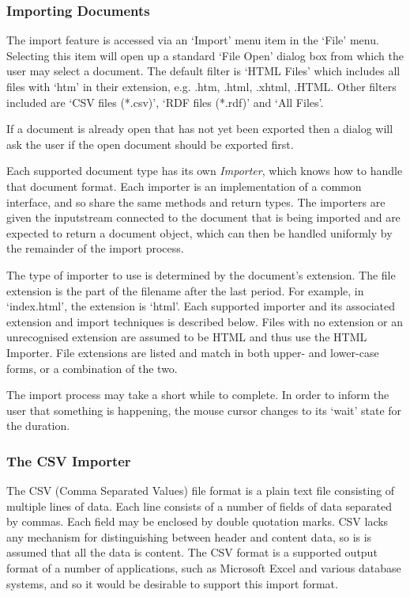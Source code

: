 \subsubsection{Importing Documents}

The import feature is accessed via an `Import' menu item in the `File' menu.
Selecting this item will open up a standard `File Open' dialog box from which
the user may select a document. The default filter is `HTML Files' which
includes all files with `htm' in their extension, e.g. .htm, .html, .xhtml,
.HTML. Other filters included are `CSV files (*.csv)', `RDF files (*.rdf)' and
`All Files'. 

If a document is already open that has not yet been exported then a
dialog will ask the user if the open document should be exported first.

Each supported document type has its own \emph{Importer}, which knows how to
handle that document format. Each importer is an implementation of a common
interface, and so share the same methods and return types. The importers are
given the inputstream connected to the document that is being imported and are
expected to return a document object, which can then be handled uniformly by
the remainder of the import process.

The type of importer to use is determined by the document's extension. The file
extension is the part of the filename after the last period. For example, in
`index.html', the extension is `html'. Each supported importer and its
associated extension and import techniques is described below. Files with no
extension or an unrecognised extension are assumed to be HTML and thus use the
HTML Importer. File extensions are listed and match in both upper- and
lower-case forms, or a combination of the two.

The import process may take a short while to complete. In order to inform the
user that something is happening, the mouse cursor changes to its `wait' state
for the duration.

\subsubsection{The CSV Importer}

The CSV (Comma Separated Values) file format is a plain text file consisting of
multiple lines of data. Each line consists of a number of fields of data
separated by commas. Each field may be enclosed by double quotation marks. CSV
lacks any mechanism for distinguishing between header and content data, so is is
assumed that all the data is content. The CSV format is a supported output
format of a number of applications, such as Microsoft Excel and various
database systems, and so it would be desirable to support this import format.

